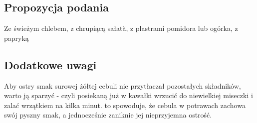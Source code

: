 \vspace{0.5cm}

\small
\subsection*{Propozycja podania}
Ze świeżym chlebem, z chrupiącą sałată, z plastrami pomidora lub ogórka, z papryką

\vspace{0.3cm}

\subsection*{Dodatkowe uwagi}
Aby ostry smak surowej żółtej cebuli nie przytłaczał pozostałych składników, warto ją sparzyć - czyli posiekaną już w kawałki wrzucić do niewielkiej miseczki i zalać wrzątkiem na kilka minut. to spowoduje, że cebula w potrawach zachowa swój pyszny smak, a jednocześnie zaniknie jej nieprzyjemna ostrość.

\newpage